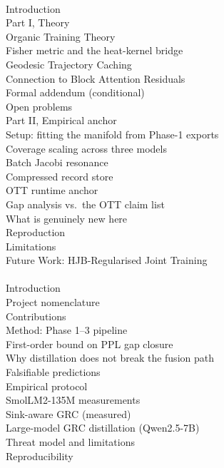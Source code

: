 \documentclass[11pt]{article}
\begin{document}
\vspace{6pt}
\\
\quad Introduction\\
\quad Part I, Theory\\
\quad \quad Organic Training Theory\\
\quad \quad Fisher metric and the heat-kernel bridge\\
\quad \quad Geodesic Trajectory Caching\\
\quad \quad Connection to Block Attention Residuals\\
\quad \quad Formal addendum (conditional)\\
\quad \quad Open problems\\
\quad Part II, Empirical anchor\\
\quad \quad Setup: fitting the manifold from Phase-1 exports\\
\quad \quad Coverage scaling across three models\\
\quad \quad Batch Jacobi resonance\\
\quad \quad Compressed record store\\
\quad \quad OTT runtime anchor\\
\quad Gap analysis vs.\ the OTT claim list\\
\quad What is genuinely new here\\
\quad Reproduction\\
\quad Limitations\\
\quad Future Work: HJB-Regularised Joint Training\\

\vspace{6pt}
\\
\quad Introduction\\
\quad \quad Project nomenclature\\
\quad \quad Contributions\\
\quad Method: Phase 1--3 pipeline\\
\quad First-order bound on PPL gap closure\\
\quad Why distillation does not break the fusion path\\
\quad Falsifiable predictions\\
\quad Empirical protocol\\
\quad \quad SmolLM2-135M measurements\\
\quad \quad Sink-aware GRC (measured)\\
\quad \quad Large-model GRC distillation (Qwen2.5-7B)\\
\quad Threat model and limitations\\
\quad Reproducibility\\
\end{document}
